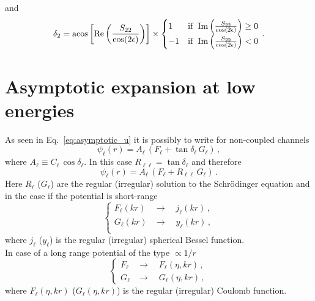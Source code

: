 \documentclass[10pt,a4paper]{article}
\newcommand{\eq}[1]{Eq.~#1}
\begin{document}
	and 
	\begin{equation}
		\delta_2 =
		\acos\left[\Re\left(\frac{S_{22}}{\cos(2\epsilon)}\right)\right]
		\times
		\begin{cases}
			1 & \mathrm{if~}\Im\left(\frac{S_{22}}{\cos(2\epsilon)}\right) \ge 0 \\
			-1 & \mathrm{if~}\Im\left(\frac{S_{22}}{\cos(2\epsilon)}\right) < 0
		\end{cases}\,.
	\end{equation}
	
	
	
		\section{Asymptotic expansion at low energies}
		As seen in \eq{\eqref{eq:asymptotic_u}} it is possibly to write for non-coupled channels
		\begin{equation}
			\psi_\ell(r) = 
			A_\ell\,
			\left(
				F_\ell
				+ \tan \delta_\ell \,
				G_\ell
			\right)\,,
		\end{equation}
		where $A_\ell \equiv C_\ell\, \cos \delta_\ell$.
		In this case $R_{\ell \ell } = \tan \delta_\ell$ and therefore
		\begin{equation}
			\psi_\ell(r) = 
			A_\ell\,
			\left(
			F_\ell
			+ R_{\ell\ell} \,
			G_\ell
			\right)\,.
		\end{equation}
		Here $R_\ell$ ($G_\ell$) are the regular (irregular) solution to the Schr\"odinger equation and in the case if the potential is short-range 
		\begin{equation}
			\begin{cases}
				F_\ell(kr) &\rightarrow\quad j_\ell(kr)\,,\\
				G_\ell(kr) &\rightarrow\quad y_\ell(kr)\,,\\
			\end{cases}
		\end{equation}
		where $j_\ell$ ($y_\ell$) is the regular (irregular) spherical Bessel function.\\
		In case of a long range potential of the type $\propto 1/r$ 
		\begin{equation}
			\begin{cases}
				F_\ell & \rightarrow \quad F_\ell(\eta, kr)\,,\\
				G_\ell & \rightarrow \quad G_\ell(\eta, kr)\,,
			\end{cases}
		\end{equation}
		where $F_\ell(\eta,kr)$ ($G_\ell(\eta,kr)$) is the regular (irregular) Coulomb function.
		
\end{document}
